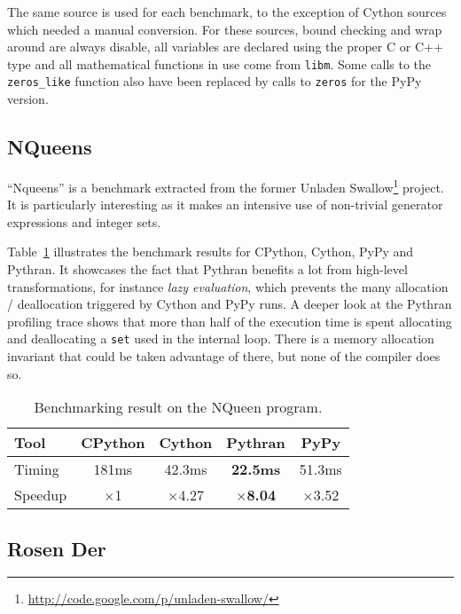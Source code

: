 \documentclass[10pt, onecolumn, preprint]{sigplanconf}
\begin{document}
The same source is used for each benchmark, to the exception of Cython sources
which needed a manual conversion. For these sources, bound checking and wrap
around are always disable, all variables are declared using the proper C or C++
type and all mathematical functions in use come from \texttt{libm}. Some calls
to the \texttt{zeros\_like} function also have been replaced by calls to
\texttt{zeros} for the PyPy version.

\subsection{NQueens}

``Nqueens'' is a benchmark extracted from the former Unladen
Swallow\footnote{\url{http://code.google.com/p/unladen-swallow/}} project. It
is particularly interesting as it makes an intensive use of non-trivial
generator expressions and integer sets.

Table~\ref{tbl:nqueen} illustrates the benchmark results for CPython, Cython,
PyPy and Pythran.  It showcases the fact that Pythran benefits a lot from
high-level transformations, for instance \emph{lazy evaluation}, which prevents
the many allocation / deallocation triggered by Cython and PyPy runs.  A deeper
look at the Pythran profiling trace shows that more than half of the execution
time is spent allocating and deallocating a \texttt{set} used in the internal
loop. There is a memory allocation invariant that could be taken advantage of
there, but none of the compiler does so.

\begin{table}
    \centering

    \begin{tabular}{|l|c|c|c|c|}
        \hline
     Tool    &  CPython    &   Cython     &     Pythran   &  PyPy \\
    \hline
    Timing  &  181ms   &   42.3ms     &    \textbf{22.5ms} &  51.3ms  \\
    \hline
    Speedup &  $\times$1         &    $\times$4.27      &    \textbf{$\times$8.04}   &  $\times$3.52    \\
    \hline
\end{tabular}
\caption{Benchmarking result on the NQueen program.}
\label{tbl:nqueen}

\end{table}

\subsection{Rosen Der}
\end{document}

